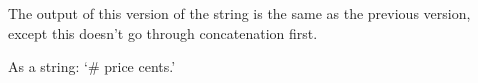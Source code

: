 The output of this version of the string is the same as the previous
version, except this doesn't go through concatenation first.

As a string: `# price cents.'

